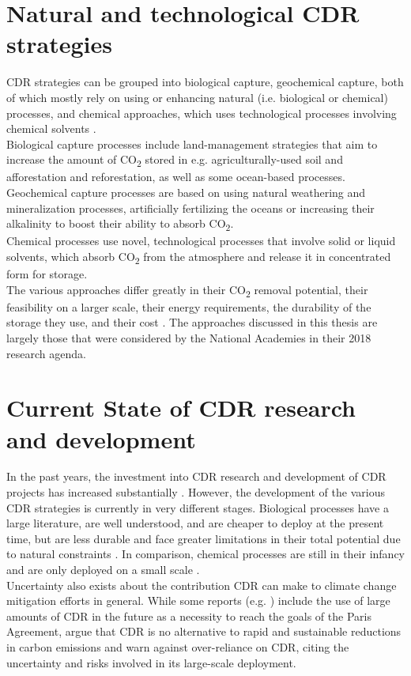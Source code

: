 \section{Natural and technological CDR strategies}
CDR strategies can be grouped into biological capture, geochemical capture, both of which mostly rely on using or enhancing natural (i.e. biological or chemical) processes, and chemical approaches, which uses technological processes involving chemical solvents \parencite{Smith2023TheEdition}.\\
Biological capture processes include land-management strategies that aim to increase the amount of CO\textsubscript{2} stored in e.g. agriculturally-used soil and afforestation and reforestation, as well as some ocean-based processes.\\
Geochemical capture processes are based on using natural weathering and mineralization processes, artificially fertilizing the oceans or increasing their alkalinity to boost their ability to absorb CO\textsubscript{2}.\\
Chemical processes use novel, technological processes that involve solid or liquid solvents, which absorb CO\textsubscript{2} from the atmosphere and release it in concentrated form for storage.\\
The various approaches differ greatly in their CO\textsubscript{2} removal potential, their feasibility on a larger scale, their energy requirements, the durability of the storage they use, and their cost \parencite[Chapter 8]{NAS2018NegativeAgenda}. The approaches discussed in this thesis are largely those that were considered by the National Academies in their 2018 research agenda.
\section{Current State of CDR research and development}
In the past years, the investment into CDR research and development of CDR projects has increased substantially \parencite[11]{Smith2023TheEdition}. However, the development of the various CDR strategies is currently in very different stages. Biological processes have a large literature, are well understood, and are cheaper to deploy at the present time, but are less durable and face greater limitations in their total potential due to natural constraints \parencite{Fuss2018NegativeEffects}. In comparison, chemical processes are still in their infancy and are only deployed on a small scale \parencite[24]{Smith2023TheEdition}.\\
Uncertainty also exists about the contribution CDR can make to climate change mitigation efforts in general. While some reports (e.g. \textcite{NAS2018NegativeAgenda}) include the use of large amounts of CDR in the future as a necessity to reach the goals of the Paris Agreement, \textcite{Fuss2018NegativeEffects} argue that CDR is no alternative to rapid and sustainable reductions in carbon emissions and warn against over-reliance on CDR, citing the uncertainty and risks involved in its large-scale deployment.\\
